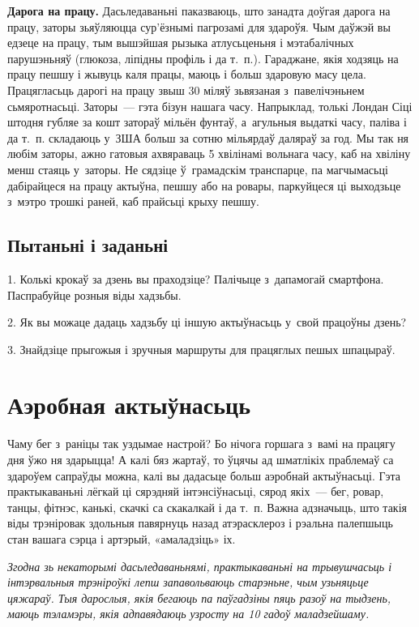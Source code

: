 \textbf{Дарога на працу.} Дасьледаваньні паказваюць, што занадта доўгая дарога на працу, заторы зьяўляюцца сур'ёзнымі пагрозамі для здароўя. Чым даўжэй вы едзеце на працу, тым вышэйшая рызыка атлусьценьня і мэтабалічных парушэньняў (глюкоза, ліпідны профіль і да т.~п.). Гараджане, якія ходзяць на працу пешшу і жывуць каля працы, маюць і больш здаровую масу цела. Працягласьць дарогі на працу звыш 30 міляў зьвязаная з~павелічэньнем сьмяротнасьці. Заторы~--- гэта бізун нашага часу. Напрыклад, толькі Лондан Сіці штодня губляе за кошт затораў мільён фунтаў, а~агульныя выдаткі часу, паліва і да т.~п. складаюць у~ЗША больш за сотню мільярдаў даляраў за год. Мы так ня любім заторы, ажно гатовыя ахвяраваць 5 хвілінамі вольнага часу, каб на хвіліну менш стаяць у~заторы. Не сядзіце ў~грамадскім транспарце, па магчымасьці дабірайцеся на працу актыўна, пешшу або на ровары, паркуйцеся ці выходзьце з~мэтро трошкі раней, каб прайсьці крыху пешшу.

\subsection*{Пытаньні і заданьні}

1. Колькі крокаў за дзень вы праходзіце? Палічыце з~дапамогай смартфона. Паспрабуйце розныя віды хадзьбы.

2. Як вы можаце дадаць хадзьбу ці іншую актыўнасьць у~свой працоўны дзень?

3. Знайдзіце прыгожыя і зручныя маршруты для працяглых пешых шпацыраў.


\section{Аэробная актыўнасьць}

Чаму бег з~раніцы так уздымае настрой? Бо нічога горшага з~вамі на працягу дня ўжо ня здарыцца! А калі бяз жартаў, то ўцячы ад шматлікіх праблемаў са здароўем сапраўды можна, калі вы дадасьце больш аэробнай актыўнасьці. Гэта практыкаваньні лёгкай ці сярэдняй інтэнсіўнасьці, сярод якіх~--- бег, ровар, танцы, фітнэс, канькі, скачкі са скакалкай і да т.~п. Важна адзначыць, што такія віды трэніровак здольныя павярнуць назад атэрасклероз і рэальна палепшыць стан вашага сэрца і артэрый, «амаладзіць» іх.

\emph{Згодна зь некаторымі дасьледаваньнямі, практыкаваньні на трывушчасьць і інтэрвальныя трэніроўкі лепш запавольваюць старэньне, чым узьняцьце цяжараў. Тыя дарослыя, якія бегаюць па паўгадзіны пяць разоў на тыдзень, маюць тэламэры, якія адпавядаюць узросту на 10 гадоў маладзейшаму.}

